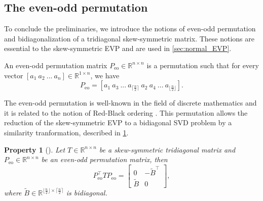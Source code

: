 \documentclass[10pt,twoside,dvipsnames]{siamart1116}
\numberwithin{algorithm}{section}
\newtheorem{property}[theorem]{Property}
\numberwithin{equation}{section}
\begin{document}
\subsection{The even-odd permutation} To conclude the preliminaries, we introduce the notions of even-odd permutation and bidiagonalization of a tridiagonal skew-symmetric matrix. These notions are essential to the skew-symmetric EVP and are used in \cref{sec:normal_EVP}.
\begin{definition}
An even-odd permutation matrix $P_{\mathrm{eo}}\in\mathbb{R}^{n\times n}$ is a permutation such that
	for every vector $[a_1\ a_2\ ...\  a_n]\in\mathbb{R}^{1\times n}$, we have \begin{equation*}
	[a_1\ a_2\ ...\  a_n]P_{\mathrm{eo}} = [a_1\ a_3\ ...\ a_{\lceil\frac{n}{2}\rceil}\ a_2\ a_4\ ... \ a_{\lfloor\frac{n}{2}\rfloor}]. 
\end{equation*}
\end{definition}
The even-odd permutation is well-known in the field of discrete mathematics and it is related to the notion of Red-Black ordering \cite{TAO2023110008}. This permutation allows the reduction of the skew-symmetric EVP to a bidiagonal SVD problem by a similarity tranformation, described in \cref{prop:even_odd_T}.
\begin{property}[{\cite{WardGray78}}]\label{prop:even_odd_T}
Let $T\in\mathbb{R}^{n\times n}$ be a skew-symmetric tridiagonal matrix and $P_{\mathrm{eo}}\in\mathbb{R}^{n\times n}$ be an even-odd permutation matrix, then
\begin{equation}
	\label{eq:even_odd}
	P_{\mathrm{eo}}^\top  T P_{\mathrm{eo}} = \begin{bmatrix}
	0&-\widetilde{B}^\top \\
	\widetilde{B}&0
	\end{bmatrix},
\end{equation} 
where $\widetilde{B}\in \mathbb{R}^{\lfloor\frac{n}{2}\rfloor\times \lceil\frac{n}{2}\rceil}$ is bidiagonal.
\end{property}
\end{document}
